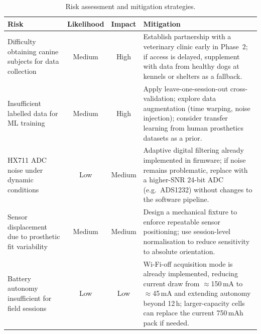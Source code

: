\begin{table}[h]
  \centering
  \caption{Risk assessment and mitigation strategies.}
  \label{tab:risks}
  \begin{tabular}{p{3.8cm} c c p{5.8cm}}
    \toprule
    \textbf{Risk} & \textbf{Likelihood} & \textbf{Impact} & \textbf{Mitigation} \\
    \midrule
    Difficulty obtaining canine subjects for data collection
    & Medium & High
    & Establish partnership with a veterinary clinic early in Phase~2;
      if access is delayed, supplement with data from healthy dogs at
      kennels or shelters as a fallback. \\
    \addlinespace
    Insufficient labelled data for ML training
    & Medium & High
    & Apply leave-one-session-out cross-validation; explore data
      augmentation (time warping, noise injection); consider transfer
      learning from human prosthetics datasets as a prior. \\
    \addlinespace
    HX711 ADC noise under dynamic conditions
    & Low & Medium
    & Adaptive digital filtering already implemented in firmware;
      if noise remains problematic, replace with a higher-SNR 24-bit
      ADC (e.g.\ ADS1232) without changes to the software pipeline. \\
    \addlinespace
    Sensor displacement due to prosthetic fit variability
    & Medium & Medium
    & Design a mechanical fixture to enforce repeatable sensor
      positioning; use session-level normalisation to reduce
      sensitivity to absolute orientation. \\
    \addlinespace
    Battery autonomy insufficient for field sessions
    & Low & Low
    & Wi-Fi-off acquisition mode is already implemented, reducing
      current draw from $\approx$150\,mA to $\approx$45\,mA and
      extending autonomy beyond 12\,h; larger-capacity cells can
      replace the current 750\,mAh pack if needed. \\
    \bottomrule
  \end{tabular}
\end{table}